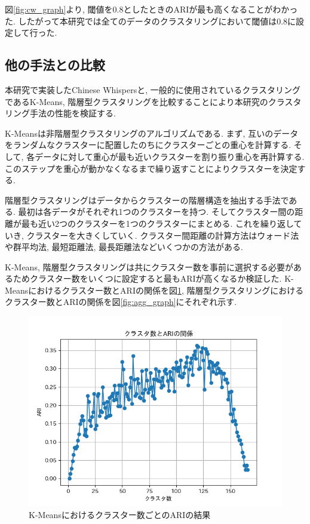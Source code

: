 \noindent
図\ref{fig:cw_graph}より, 閾値を0.8としたときのARIが最も高くなることがわかった. したがって本研究では全てのデータのクラスタリングにおいて閾値は0.8に設定して行った. 

\subsection{他の手法との比較}
本研究で実装したChinese Whispersと, 一般的に使用されているクラスタリングであるK-Means, 階層型クラスタリングを比較することにより本研究のクラスタリング手法の性能を検証する. 

K-Meansは非階層型クラスタリングのアルゴリズムである. まず, 互いのデータをランダムなクラスターに配置したのちにクラスターごとの重心を計算する. そして, 各データに対して重心が最も近いクラスターを割り振り重心を再計算する. このステップを重心が動かなくなるまで繰り返すことによりクラスターを決定する.

階層型クラスタリングはデータからクラスターの階層構造を抽出する手法である. 最初は各データがそれぞれ1つのクラスターを持つ. そしてクラスター間の距離が最も近い2つのクラスターを1つのクラスターにまとめる. これを繰り返していき, クラスターを大きくしていく. クラスター間距離の計算方法はウォード法や群平均法, 最短距離法, 最長距離法などいくつかの方法がある. 

K-Means, 階層型クラスタリングは共にクラスター数を事前に選択する必要があるためクラスター数をいくつに設定すると最もARIが高くなるか検証した. 
K-Meansにおけるクラスター数とARIの関係を図\ref{fig:kmeans_graph}, 階層型クラスタリングにおけるクラスター数とARIの関係を図\ref{fig:agg_graph}にそれぞれ示す.

\begin{figure}[H]
  \centering
  \includegraphics[scale=0.8]
    {contents/images/kmeans_graph.png}
  \caption{K-Meansにおけるクラスター数ごとのARIの結果\label{fig:kmeans_graph}}
\end{figure}

